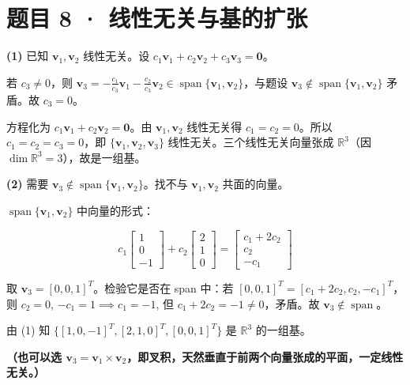 \documentclass[12pt]{ctexart}
\begin{document}
\section*{题目 8 · 线性无关与基的扩张}

\textbf{(1)} 已知 $\mathbf{v}_1, \mathbf{v}_2$ 线性无关。设 $c_1\mathbf{v}_1 + c_2\mathbf{v}_2 + c_3\mathbf{v}_3 = \mathbf{0}$。

若 $c_3 \neq 0$，则 $\mathbf{v}_3 = -\frac{c_1}{c_3}\mathbf{v}_1 - \frac{c_2}{c_3}\mathbf{v}_2 \in \operatorname{span}\{\mathbf{v}_1, \mathbf{v}_2\}$，与题设 $\mathbf{v}_3 \notin \operatorname{span}\{\mathbf{v}_1, \mathbf{v}_2\}$ 矛盾。故 $c_3 = 0$。

方程化为 $c_1\mathbf{v}_1 + c_2\mathbf{v}_2 = \mathbf{0}$。由 $\mathbf{v}_1, \mathbf{v}_2$ 线性无关得 $c_1 = c_2 = 0$。所以 $c_1 = c_2 = c_3 = 0$，即 $\{\mathbf{v}_1, \mathbf{v}_2, \mathbf{v}_3\}$ 线性无关。三个线性无关向量张成 $\mathbb{R}^3$（因 $\dim\mathbb{R}^3 = 3$），故是一组基。

\textbf{(2)} 需要 $\mathbf{v}_3 \notin \operatorname{span}\{\mathbf{v}_1, \mathbf{v}_2\}$。找不与 $\mathbf{v}_1, \mathbf{v}_2$ 共面的向量。

$\operatorname{span}\{\mathbf{v}_1, \mathbf{v}_2\}$ 中向量的形式：

\[
c_1\begin{bmatrix}1\\0\\-1\end{bmatrix} + c_2\begin{bmatrix}2\\1\\0\end{bmatrix}
= \begin{bmatrix} c_1+2c_2 \\ c_2 \\ -c_1 \end{bmatrix}
\]

取 $\mathbf{v}_3 = [0, 0, 1]^T$。检验它是否在 span 中：若 $[0, 0, 1]^T = [c_1+2c_2, c_2, -c_1]^T$，则 $c_2 = 0$, $-c_1 = 1 \implies c_1 = -1$, 但 $c_1+2c_2 = -1 \neq 0$，矛盾。故 $\mathbf{v}_3 \notin \operatorname{span}$。

由 (1) 知 $\{[1,0,-1]^T, [2,1,0]^T, [0,0,1]^T\}$ 是 $\mathbb{R}^3$ 的一组基。

\textbf{（也可以选 $\mathbf{v}_3 = \mathbf{v}_1 \times \mathbf{v}_2$，即叉积，天然垂直于前两个向量张成的平面，一定线性无关。）}
\end{document}
